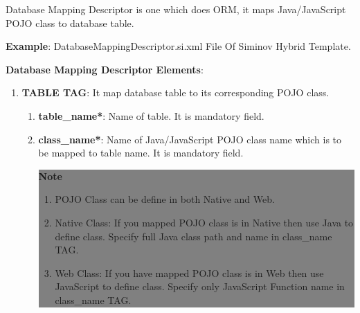 Database Mapping Descriptor is one which does ORM, it maps Java/JavaScript POJO class to database table.



\textbf{Example}: DatabaseMappingDescriptor.si.xml File Of Siminov Hybrid Template.



\newpage
\textbf{Database Mapping Descriptor Elements}:



\begin{enumerate}

	\item \small \textbf{TABLE TAG}: It map database table to its corresponding POJO class.

		\begin{enumerate}

			\item \small \textbf{table\_name*}: Name of table. It is mandatory field.
			\item \small \textbf{class\_name*}: Name of Java/JavaScript POJO class name which is to be mapped to table name. It is mandatory field.

	\begin{center}
		\colorbox{grey}{
			\parbox[t]{.8\linewidth}{
				\fontsize{11pt}{11pt}\selectfont %
				\vspace*{0.1cm} %
		
				\hfill \textbf{Note} \\

				\hfill 

				\begin{enumerate}

					\item \small POJO Class can be define in both Native and Web.
					
					\item \small Native Class: If you mapped POJO class is in Native then use Java to define class. Specify full Java class path and name in class\_name TAG.

					\item \small Web Class: If you have mapped POJO class is in Web then use JavaScript to define class. Specify only JavaScript Function name in class\_name TAG.


\end{enumerate}}}
\end{center}
\end{enumerate}
\end{enumerate}
